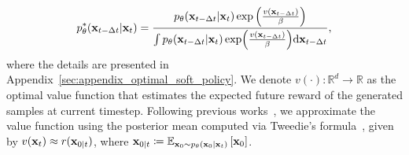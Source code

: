 {\small
    \begin{align}
    \label{eq:optimal_policy}
        p^{*}_\theta(\mathbf{x}_{t-\Delta t} | \mathbf{x}_{t}) = \frac{ p_\theta(\mathbf{x}_{t-\Delta t} | \mathbf{x}_{t}) \exp \left(\frac{v(\mathbf{x}_{t-\Delta t})}{\beta}  \right)}{\int p_\theta(\mathbf{x}_{t-\Delta t} | \mathbf{x}_{t}) \exp \Bigl(\frac{v(\mathbf{x}_{t-\Delta t})}{\beta} \Bigr) \mathrm{d}\mathbf{x}_{t-\Delta t}},
    \end{align}
}%
where the details are presented in Appendix~\ref{sec:appendix_optimal_soft_policy}. 
We denote $v(\cdot): \mathbb{R}^d \rightarrow \mathbb{R}$ as the optimal value function that estimates the expected future reward of the generated samples at current timestep. 
Following previous works~\cite{Chung:2023DPS,Kim:2025DAS, Li2024:SVDD,Bansal:2023UGD}, we approximate the value function using the posterior mean computed via Tweedie’s formula~\cite{Robbins1992}, given by $v(\mathbf{x}_t) \approx r(\mathbf{x}_{0|t})$, where $\mathbf{x}_{0|t} \coloneq \mathbb{E}_{\mathbf{x}_0 \sim p_{\theta}(\mathbf{x}_0 | \mathbf{x}_t)} \left[ \mathbf{x}_0 \right]$. 





